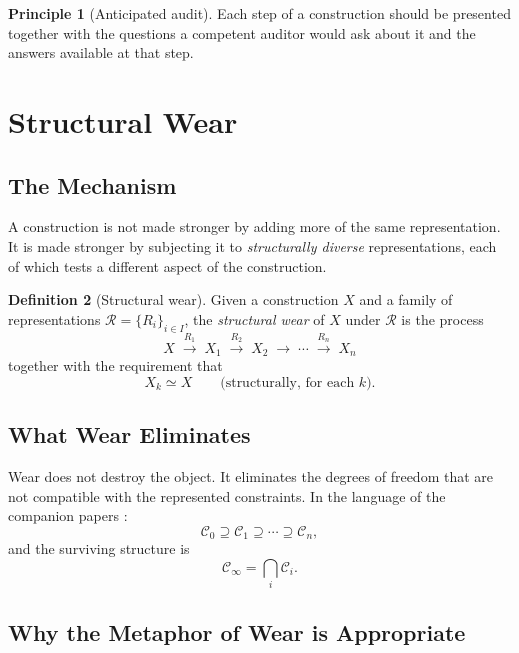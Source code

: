 \documentclass[11pt,a4paper]{article}
\theoremstyle{definition}
\newtheorem{definition}{Definition}[section]
\newtheorem{principle}[definition]{Principle}
\theoremstyle{plain}
\newcommand{\Ccal}{\mathcal{C}}
\newcommand{\Rcal}{\mathcal{R}}
\begin{document}
\begin{principle}[Anticipated audit]\label{pr:anticipated}
Each step of a construction should be presented together with the
questions a competent auditor would ask about it and the answers
available at that step.
\end{principle}

\section{Structural Wear}
\label{sec:wear}

\subsection{The Mechanism}

A construction is not made stronger by adding more of the same
representation. It is made stronger by subjecting it to
\emph{structurally diverse} representations, each of which tests a
different aspect of the construction.

\begin{definition}[Structural wear]\label{def:wear}
Given a construction $X$ and a family of representations
$\Rcal = \{R_i\}_{i \in I}$, the \emph{structural wear} of $X$
under $\Rcal$ is the process
\[
  X
  \;\xrightarrow{R_1}\;
  X_1
  \;\xrightarrow{R_2}\;
  X_2
  \;\longrightarrow\;
  \cdots
  \;\xrightarrow{R_n}\;
  X_n
\]
together with the requirement that
\[
  X_k \simeq X
  \qquad \text{(structurally, for each } k \text{)}.
\]
\end{definition}

\subsection{What Wear Eliminates}

Wear does not destroy the object. It eliminates the degrees of
freedom that are not compatible with the represented constraints.
In the language of the companion papers \cite{paperI,paperII}:
\[
  \Ccal_0 \supseteq \Ccal_1 \supseteq \cdots \supseteq \Ccal_n,
\]
and the surviving structure is
\[
  \Ccal_\infty = \bigcap_i \Ccal_i .
\]

\subsection{Why the Metaphor of Wear is Appropriate}
\end{document}

